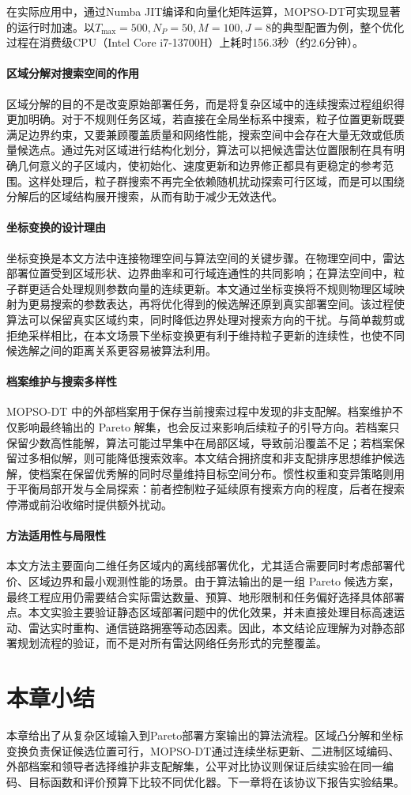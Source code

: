 在实际应用中，通过Numba JIT编译和向量化矩阵运算，MOPSO-DT可实现显著的运行时加速。以$T_{\max}=500, N_P=50, M=100, J=8$的典型配置为例，整个优化过程在消费级CPU（Intel Core i7-13700H）上耗时156.3秒（约2.6分钟）。

\FloatBarrier

\paragraph{区域分解对搜索空间的作用}
区域分解的目的不是改变原始部署任务，而是将复杂区域中的连续搜索过程组织得更加明确。对于不规则任务区域，若直接在全局坐标系中搜索，粒子位置更新既要满足边界约束，又要兼顾覆盖质量和网络性能，搜索空间中会存在大量无效或低质量候选点。通过先对区域进行结构化划分，算法可以把候选雷达位置限制在具有明确几何意义的子区域内，使初始化、速度更新和边界修正都具有更稳定的参考范围。这样处理后，粒子群搜索不再完全依赖随机扰动探索可行区域，而是可以围绕分解后的区域结构展开搜索，从而有助于减少无效迭代。

\paragraph{坐标变换的设计理由}
坐标变换是本文方法中连接物理空间与算法空间的关键步骤。在物理空间中，雷达部署位置受到区域形状、边界曲率和可行域连通性的共同影响；在算法空间中，粒子群更适合处理规则参数向量的连续更新。本文通过坐标变换将不规则物理区域映射为更易搜索的参数表达，再将优化得到的候选解还原到真实部署空间。该过程使算法可以保留真实区域约束，同时降低边界处理对搜索方向的干扰。与简单裁剪或拒绝采样相比，在本文场景下坐标变换更有利于维持粒子更新的连续性，也使不同候选解之间的距离关系更容易被算法利用。

\paragraph{档案维护与搜索多样性}
MOPSO-DT 中的外部档案用于保存当前搜索过程中发现的非支配解。档案维护不仅影响最终输出的 Pareto 解集，也会反过来影响后续粒子的引导方向。若档案只保留少数高性能解，算法可能过早集中在局部区域，导致前沿覆盖不足；若档案保留过多相似解，则可能降低搜索效率。本文结合拥挤度和非支配排序思想维护候选解，使档案在保留优秀解的同时尽量维持目标空间分布。惯性权重和变异策略则用于平衡局部开发与全局探索：前者控制粒子延续原有搜索方向的程度，后者在搜索停滞或前沿收缩时提供额外扰动。

\paragraph{方法适用性与局限性}
本文方法主要面向二维任务区域内的离线部署优化，尤其适合需要同时考虑部署代价、区域边界和最小观测性能的场景。由于算法输出的是一组 Pareto 候选方案，最终工程应用仍需要结合实际雷达数量、预算、地形限制和任务偏好选择具体部署点。本文实验主要验证静态区域部署问题中的优化效果，并未直接处理目标高速运动、雷达实时重构、通信链路拥塞等动态因素。因此，本文结论应理解为对静态部署规划流程的验证，而不是对所有雷达网络任务形式的完整覆盖。

\section{本章小结}

本章给出了从复杂区域输入到Pareto部署方案输出的算法流程。区域凸分解和坐标变换负责保证候选位置可行，MOPSO-DT通过连续坐标更新、二进制区域编码、外部档案和领导者选择维护非支配解集，公平对比协议则保证后续实验在同一编码、目标函数和评价预算下比较不同优化器。下一章将在该协议下报告实验结果。
